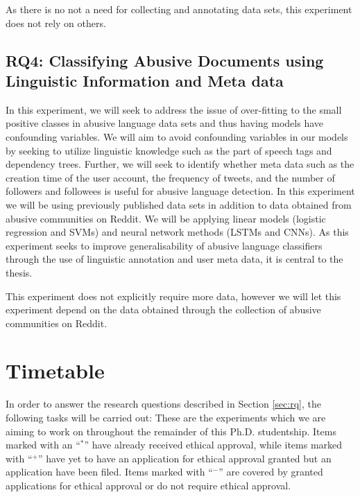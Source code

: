 As there is no not a need for collecting and annotating data sets, this experiment does not rely on others.

\subsection{RQ4: Classifying Abusive Documents using Linguistic Information and Meta data}\label{sub:structuredpred}
In this experiment, we will seek to address the issue of over-fitting to the small positive classes in abusive language data sets and thus having models have confounding variables. We will aim to avoid confounding variables in our models by seeking to utilize linguistic knowledge such as the part of speech tags and dependency trees. Further, we will seek to identify whether meta data such as the creation time of the user account, the frequency of tweets, and the number of followers and followees is useful for abusive language detection. In this experiment we will be using previously published data sets \citep{Waseem:2016,Waseem-Hovy:2016,Davidson:2017} in addition to data obtained from abusive communities on Reddit. We will be applying linear models (logistic regression and SVMs) and neural network methods (LSTMs and CNNs). As this experiment seeks to improve generalisability of abusive language classifiers through the use of linguistic annotation and user meta data, it is central to the thesis.

This experiment does not explicitly require more data, however we will let this experiment depend on the data obtained through the collection of abusive communities on Reddit.


\section{Timetable}\label{sec:timetable}
In order to answer the research questions described in Section \autoref{sec:rq}, the following tasks will be carried out:
These are the experiments which we are aiming to work on throughout the remainder of this Ph.D. studentship. Items marked with an ``$^*$'' have already received ethical approval, while items marked with ``$^+$'' have yet to have an application for ethical approval granted but an application have been filed. Items marked with ``$^-$'' are covered by granted applications for ethical approval or do not require ethical approval.
\newpage

